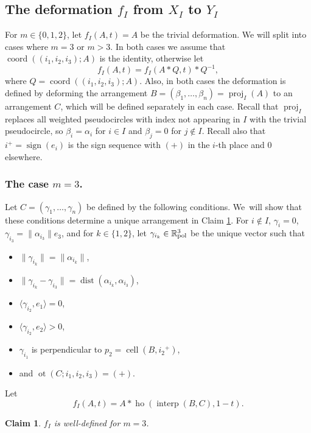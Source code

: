 \documentclass[11pt]{article}
\numberwithin{equation}{section}
\newtheorem{claim}[theorem]{Claim}
\theoremstyle{remark}
\let\mb\mathbb
\DeclareMathOperator{\sign}{sign}
\DeclareMathOperator{\dist}{dist}
\DeclareMathOperator{\cell}{cell}
\newcommand{\Rpol}[1]{\mb{R}\mathrlap{{}^{#1}}{}_\text{pol}}
\DeclareMathOperator{\proj}{proj}
\DeclareMathOperator{\interp}{interp}
\DeclareMathOperator{\coord}{coord}
\DeclareMathOperator{\ho}{ho}
\DeclareMathOperator{\ot}{ot}
\begin{document}
\subsection{The deformation $f_I$ from $X_I$ to $Y_I$}
\label{subsubsec-f}

For $m \in \{0,1,2\}$, let $f_I(A,t) = A$ be the trivial deformation.
We will split into cases where $m=3$ or $m >3$.
In both cases we assume that $\coord((i_1,i_2,i_3);A)$ is the identity, otherwise let
\[
f_I(A,t) = f_I(A*Q,t)*Q^{-1},
\]
where $Q = \coord((i_1,i_2,i_3);A)$.
Also, in both cases the deformation is defined by deforming the arrangement $B = (\beta_1,\dots,\beta_n) = \proj_I(A)$ to an arrangement $C$, which will be defined separately in each case. Recall that $\proj_I$ replaces all weighted pseudocircles with index not appearing in $I$ with the trivial pseudocircle, so $\beta_i = \alpha_i$ for $i \in I$ and $\beta_j = 0$ for $j \not\in I$.
Recall also that $i^+ = \sign(e_i)$ is the sign sequence with $(+)$ in the $i$-th place and $0$ elsewhere.

\subsubsection*{The case $m=3$.}
Let $C = (\gamma_1,\dots,\gamma_n)$ be defined by the following conditions. We~will show that these conditions determine a unique arrangement in Claim \ref{claim-well-defined-f3}.
For $i \not\in I$, $\gamma_i = 0$,
$\gamma_{i_3} = \|\alpha_{i_3}\|e_3$,
and for $k \in \{1,2\}$,
let
$\gamma_{i_k} \in \Rpol{3}$ be the unique vector such that
\begin{itemize}
\item
$\|\gamma_{i_k}\| = \|\alpha_{i_k}\|$,
\item
$\|\gamma_{i_k} -\gamma_{i_3}\| = \dist(\alpha_{i_k},\alpha_{i_3})$,
\item
$\langle \gamma_{i_2}, e_1 \rangle = 0$,
\item
$\langle \gamma_{i_2}, e_2 \rangle > 0$,
\item
$\gamma_{i_1}$ is perpendicular to $p_2 = \cell(B,{i_2}^+)$,
\item
and $\ot(C;i_1,i_2,i_3) = (+)$.
\end{itemize}
Let
\[ f_{I}(A,t) = A*\ho(\interp(B,C),1-t).\]

\begin{claim}\label{claim-well-defined-f3}
$f_I$ is well-defined for $m=3$.
\end{claim}
\end{document}
